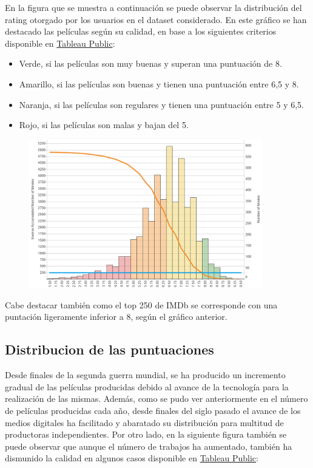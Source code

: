 \documentclass{article}
\begin{document}
En la figura que se muestra a continuación se puede observar la distribución del rating otorgado por los usuarios en el dataset considerado. En este gráfico se han destacado las películas según su calidad, en base a los siguientes criterios disponible en \href{https://public.tableau.com/profile/javier6580\#!/vizhome/proyecto_fin_de_master_dataset/rating_distribution}{Tableau Public}:

\begin{itemize}
  \item Verde, si las películas son muy buenas y superan una puntuación de 8.
  \item Amarillo, si las películas son buenas y tienen una puntuación entre 6,5 y 8.
  \item Naranja, si las películas son regulares y tienen una puntuación entre 5 y 6,5.
  \item Rojo, si las películas son malas y bajan del 5.
\end{itemize}

\begin{figure}[h]
\centering
\includegraphics[width=4in,clip,keepaspectratio]{./images/rating_distribution}
\label{fig:imdb_rating_distribution}
\end{figure}

Cabe destacar también como el top 250 de IMDb se corresponde con una puntación ligeramente inferior a 8, según el gráfico anterior.

\subsection{Distribucion de las puntuaciones}

Desde finales de la segunda guerra mundial, se ha producido un incremento gradual de las películas producidas debido al avance de la tecnología para la realización de las mismas. Además, como se pudo ver anteriormente en el número de películas producidas cada año, desde finales del siglo pasado el avance de los medios digitales ha facilitado y abaratado su distribución para multitud de productoras independientes\cite{popmatters}. Por otro lado, en la siguiente figura también se puede observar que aunque el número de trabajos ha aumentado, también ha dismunido la calidad en algunos casos disponible en \href{https://public.tableau.com/profile/javier6580\#!/vizhome/proyecto_fin_de_master_dataset/rating_year}{Tableau Public}:
\end{document}
